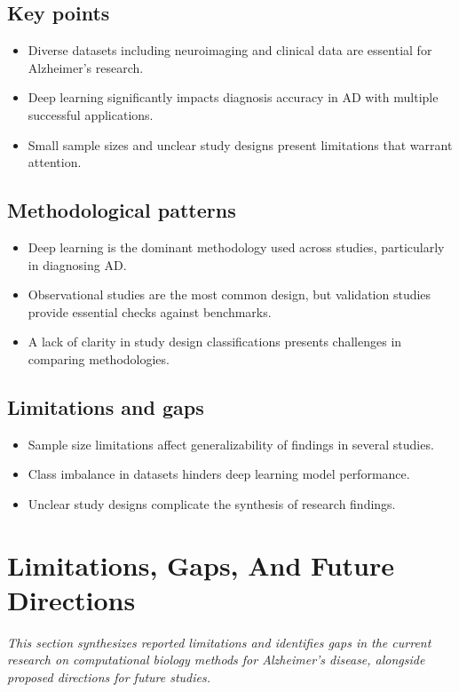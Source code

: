 \documentclass{MITcsail}
\begin{document}
\subsection*{Key points}
\begin{itemize}
  \item Diverse datasets including neuroimaging and clinical data are essential for Alzheimer's research.
  \item Deep learning significantly impacts diagnosis accuracy in AD with multiple successful applications.
  \item Small sample sizes and unclear study designs present limitations that warrant attention.
\end{itemize}

\subsection*{Methodological patterns}
\begin{itemize}
  \item Deep learning is the dominant methodology used across studies, particularly in diagnosing AD.
  \item Observational studies are the most common design, but validation studies provide essential checks against benchmarks.
  \item A lack of clarity in study design classifications presents challenges in comparing methodologies.
\end{itemize}

\subsection*{Limitations and gaps}
\begin{itemize}
  \item Sample size limitations affect generalizability of findings in several studies.
  \item Class imbalance in datasets hinders deep learning model performance.
  \item Unclear study designs complicate the synthesis of research findings.
\end{itemize}

\section{Limitations, Gaps, And Future Directions}

\textit{This section synthesizes reported limitations and identifies gaps in the current research on computational biology methods for Alzheimer's disease, alongside proposed directions for future studies.}
\end{document}
